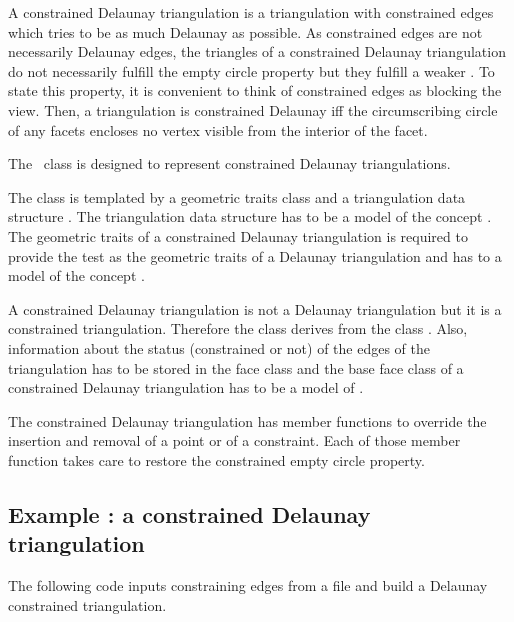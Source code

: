 \label{Subsection_2D_Triangulations_Constrained_Delaunay_Description}
A constrained Delaunay triangulation is a triangulation with
constrained edges which tries to be as much Delaunay as possible.
As constrained edges are not necessarily Delaunay edges,
the triangles of a constrained Delaunay triangulation do not
necessarily fulfill the empty circle property
but they fulfill a weaker .
 To state this property,
it is convenient to think of  constrained
edges as blocking the view. Then, a triangulation is 
constrained Delaunay iff
 the circumscribing circle
of any facets encloses 
no vertex  visible
from the interior of the facet.

The \cgal\ class
is designed to represent
constrained Delaunay triangulations.

The class is templated by a geometric traits class 
and a triangulation data structure .
The triangulation data structure has to be a model of the concept
.
 The geometric traits 
of a constrained Delaunay triangulation is required
to provide the  test as the geometric traits
of a Delaunay triangulation and has to a model of the concept
.

A constrained Delaunay triangulation is not a Delaunay
triangulation but it is a constrained triangulation.
Therefore the class
derives from
the class .
Also, information about the status (constrained or not)
of the edges of the triangulation has to be stored
in the face class
 and the base face class
of a constrained Delaunay triangulation has to be a model
of .


The constrained Delaunay triangulation
has member functions to override the 
insertion and removal of a point or of a constraint.
Each of those member function takes care
to  restore
 the constrained empty circle
property.

\subsection{Example : a  constrained Delaunay triangulation}
\label{Subsection_2D_Triangulations_Constrained_Delaunay_Example}
The following code inputs constraining edges from a file
and build a Delaunay constrained triangulation.


